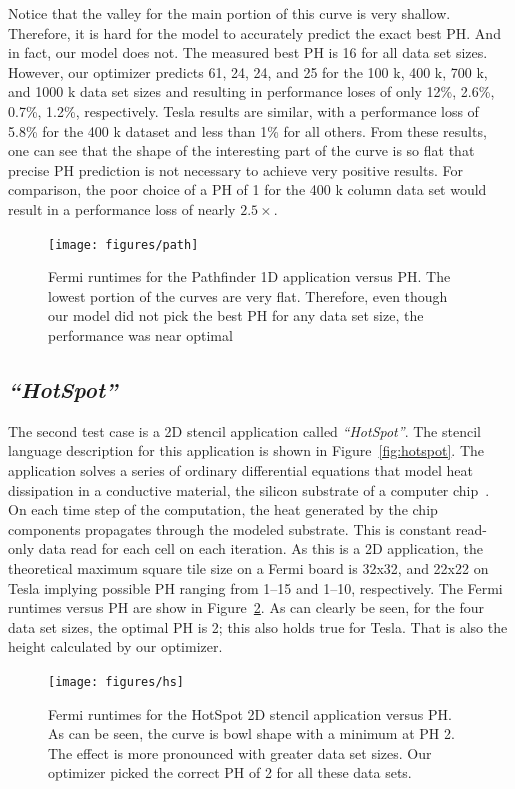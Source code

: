 \documentclass{sig-alternate}
\begin{document}
Notice that the valley for the main portion of this curve is very shallow.
Therefore, it is hard for the model to accurately predict the exact best PH.
And in fact, our model does not.  The measured best PH is 16 for all data set
sizes.  However, our optimizer predicts 61, 24, 24, and 25 for the 100 k, 400
k, 700 k, and 1000 k data set sizes and resulting in performance loses of
only 12\%, 2.6\%, 0.7\%, 1.2\%, respectively.  Tesla results are similar,
with a performance loss of 5.8\% for the 400 k dataset and less than 1\% for
all others.  From these results, one can see that the shape of the
interesting part of the curve is so flat that precise PH prediction is not
necessary to achieve very positive results.  For comparison, the poor choice
of a PH of 1 for the 400 k column data set would result in a performance loss
of nearly $2.5\times$.
\begin{figure}
\texttt{[image: figures/path]}
\caption{Fermi runtimes for the Pathfinder 1D application versus PH.  The lowest
  portion of the curves are very flat.  Therefore, even though our model did
  not pick the best PH for any data set size, the performance was near
  optimal}
\label{fig:pathfinderTimes}
\end{figure}

\subsection{\em ``HotSpot''}
The second test case is a 2D stencil application called {\em ``HotSpot''}.
The stencil language description for this application is shown in
Figure~\ref{fig:hotspot}.  The application solves a series of ordinary
differential equations that model heat dissipation in a conductive material,
the silicon substrate of a computer chip~\cite{hotspot}.  On each time step
of the computation, the heat generated by the chip components propagates
through the modeled substrate.  This is constant read-only data read for each
cell on each iteration.  As this is a 2D application, the theoretical maximum
square tile size on a Fermi board is 32x32, and 22x22 on Tesla implying
possible PH ranging from 1--15 and 1--10, respectively.  The Fermi runtimes
versus PH are show in Figure~\ref{fig:hotspotTimes}.  As can clearly be seen,
for the four data set sizes, the optimal PH is 2; this also holds true for
Tesla.  That is also the height calculated by our optimizer.
\begin{figure}
\texttt{[image: figures/hs]}
\caption{Fermi runtimes for the HotSpot 2D stencil application versus PH.  As can
  be seen, the curve is bowl shape with a minimum at PH 2.  The effect is
  more pronounced with greater data set sizes.  Our optimizer picked the
  correct PH of 2 for all these data sets.}
\label{fig:hotspotTimes}
\end{figure}
\end{document}
